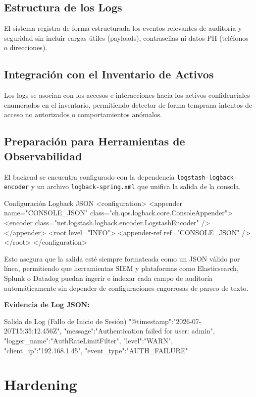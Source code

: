 \documentclass[11pt,oneside]{article}
\begin{document}
\subsection{Estructura de los Logs}
El sistema registra de forma estructurada los eventos relevantes de auditoría y seguridad sin incluir cargas útiles (payloads), contraseñas ni datos PII (teléfonos o direcciones).

\subsection{Integración con el Inventario de Activos}
Los logs se asocian con los accesos e interacciones hacia los activos confidenciales enumerados en el inventario, permitiendo detectar de forma temprana intentos de acceso no autorizados o comportamientos anómalos.

\subsection{Preparación para Herramientas de Observabilidad}
El backend se encuentra configurado con la dependencia \texttt{logstash-logback-encoder} y un archivo \texttt{logback-spring.xml} que unifica la salida de la consola.

\begin{codewindow}[language=XML]{Configuración Logback JSON}
<configuration>
    <appender name="CONSOLE_JSON" class="ch.qos.logback.core.ConsoleAppender">
        <encoder class="net.logstash.logback.encoder.LogstashEncoder" />
    </appender>
    <root level="INFO">
        <appender-ref ref="CONSOLE_JSON" />
    </root>
</configuration>
\end{codewindow}
Esto asegura que la salida esté siempre formateada como un JSON válido por línea, permitiendo que herramientas SIEM y plataformas como Elasticsearch, Splunk o Datadog puedan ingerir e indexar cada campo de auditoría automáticamente sin depender de configuraciones engorrosas de parseo de texto.

\textbf{Evidencia de Log JSON:}
\begin{codewindow}[language=Text]{Salida de Log (Fallo de Inicio de Sesión)}
{"@timestamp":"2026-07-20T15:35:12.456Z", "message":"Authentication failed for user: admin", "logger_name":"AuthRateLimitFilter", "level":"WARN", "client_ip":"192.168.1.45", "event_type":"AUTH_FAILURE"}
\end{codewindow}

\section{Hardening}
\end{document}
